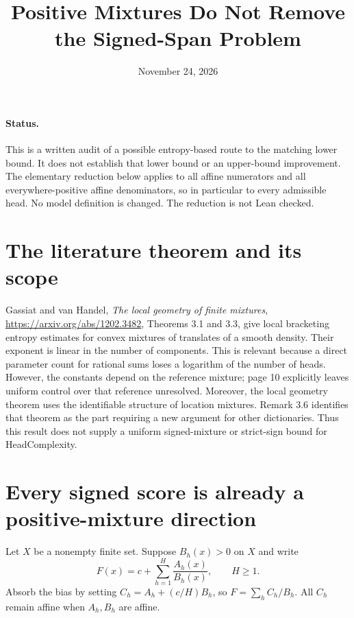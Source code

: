 \documentclass[11pt]{article}
\title{Positive Mixtures Do Not Remove the Signed-Span Problem}
\author{}
\date{November 24, 2026}
\begin{document}
\maketitle

\paragraph{Status.}
This is a written audit of a possible entropy-based route to the
matching lower bound. It does not establish that lower bound or an
upper-bound improvement. The elementary reduction below applies to
all affine numerators and all everywhere-positive affine denominators,
so in particular to every admissible head. No model definition is
changed. The reduction is not Lean checked.

\section{The literature theorem and its scope}
Gassiat and van Handel, \emph{The local geometry of finite mixtures},
\url{https://arxiv.org/abs/1202.3482}, Theorems 3.1 and 3.3,
give local bracketing entropy estimates for convex mixtures of
translates of a smooth density. Their exponent is linear in the
number of components. This is relevant because a direct parameter
count for rational sums loses a logarithm of the number of heads.
However, the constants depend on the reference mixture; page 10
explicitly leaves uniform control over that reference unresolved.
Moreover, the local geometry theorem uses the identifiable structure
of location mixtures. Remark 3.6 identifies that theorem as the part
requiring a new argument for other dictionaries. Thus this result
does not supply a uniform signed-mixture or strict-sign bound for
HeadComplexity.

\section{Every signed score is already a positive-mixture direction}
Let $X$ be a nonempty finite set. Suppose $B_h(x)>0$ on $X$ and
write
\[
 F(x)=c+\sum_{h=1}^H\frac{A_h(x)}{B_h(x)},\qquad H\geq1.
\]
Absorb the bias by setting $C_h=A_h+(c/H)B_h$, so
$F=\sum_h C_h/B_h$. All $C_h$ remain affine when $A_h,B_h$
are affine.
\end{document}
